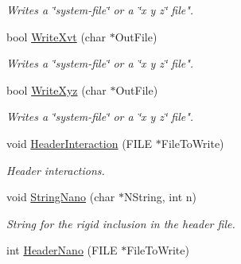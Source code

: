 \begin{DoxyCompactItemize}
\begin{DoxyCompactList}\small\item\em Writes a \char`\"{}system-\/file\char`\"{} or a \char`\"{}x y z\char`\"{} file". \end{DoxyCompactList}\item 
bool \hyperlink{classVarData_a4bed1297ee4f1c6966e1f8389e3b34c8}{Write\+Xvt} (char $\ast$Out\+File)\hypertarget{classVarData_a4bed1297ee4f1c6966e1f8389e3b34c8}{}\label{classVarData_a4bed1297ee4f1c6966e1f8389e3b34c8}

\begin{DoxyCompactList}\small\item\em Writes a \char`\"{}system-\/file\char`\"{} or a \char`\"{}x y z\char`\"{} file". \end{DoxyCompactList}\item 
bool \hyperlink{classVarData_a842c747bebda7f52b905605b1446c814}{Write\+Xyz} (char $\ast$Out\+File)\hypertarget{classVarData_a842c747bebda7f52b905605b1446c814}{}\label{classVarData_a842c747bebda7f52b905605b1446c814}

\begin{DoxyCompactList}\small\item\em Writes a \char`\"{}system-\/file\char`\"{} or a \char`\"{}x y z\char`\"{} file". \end{DoxyCompactList}\item 
void \hyperlink{classVarData_a4a4c970350675e5a82a935c754264d14}{Header\+Interaction} (F\+I\+LE $\ast$File\+To\+Write)\hypertarget{classVarData_a4a4c970350675e5a82a935c754264d14}{}\label{classVarData_a4a4c970350675e5a82a935c754264d14}

\begin{DoxyCompactList}\small\item\em Header interactions. \end{DoxyCompactList}\item 
void \hyperlink{classVarData_ab0cc3088657341d2696949515927e91c}{String\+Nano} (char $\ast$N\+String, int n)\hypertarget{classVarData_ab0cc3088657341d2696949515927e91c}{}\label{classVarData_ab0cc3088657341d2696949515927e91c}

\begin{DoxyCompactList}\small\item\em String for the rigid inclusion in the header file. \end{DoxyCompactList}\item 
int \hyperlink{classVarData_af86d3fd2dc311c093cd03f65eb3fadd9}{Header\+Nano} (F\+I\+LE $\ast$File\+To\+Write)\hypertarget{classVarData_af86d3fd2dc311c093cd03f65eb3fadd9}{}\label{classVarData_af86d3fd2dc311c093cd03f65eb3fadd9}


\end{DoxyCompactItemize}
